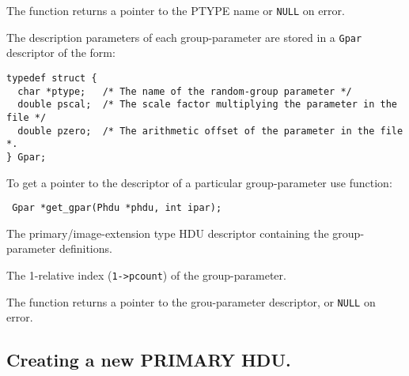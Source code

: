 The function returns a pointer to the PTYPE name or \verb`NULL` on error.

The description parameters of each group-parameter are stored in a
\verb`Gpar` descriptor of the form:

\begin{verbatim}
typedef struct {
  char *ptype;   /* The name of the random-group parameter */
  double pscal;  /* The scale factor multiplying the parameter in the file */
  double pzero;  /* The arithmetic offset of the parameter in the file *.
} Gpar;
\end{verbatim}

To get a pointer to the descriptor of a particular group-parameter use
function:

\label{get_gpar}\begin{verbatim}
 Gpar *get_gpar(Phdu *phdu, int ipar);
\end{verbatim}

\begin{arglist}

  The primary/image-extension type HDU descriptor
                    containing the group-parameter definitions.

  The 1-relative index (\verb`1->pcount`) of the
                    group-parameter.
\end{arglist}

The function returns a pointer to the grou-parameter descriptor, or
\verb`NULL` on error.


\subsection{Creating a new PRIMARY HDU.}

